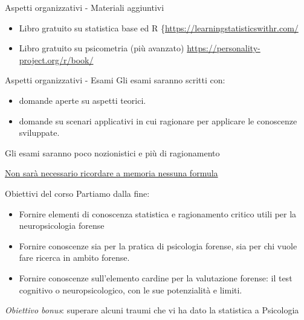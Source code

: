 \documentclass[
  ignorenonframetext,
]{beamer}
\providecommand{\tightlist}{%
  \setlength{\itemsep}{0pt}\setlength{\parskip}{0pt}}
\begin{document}
\begin{frame}{Aspetti organizzativi - Materiali aggiuntivi}
\label{aspetti-organizzativi---materiali-aggiuntivi}
\begin{itemize}
\item
  Libro gratuito su statistica base ed R
  \{\underline{https://learningstatisticswithr.com/}
\item
  Libro gratuito su psicometria (più avanzato)
  \underline{https://personality-project.org/r/book/}
\end{itemize}
\end{frame}

\begin{frame}{Aspetti organizzativi - Esami}
\label{aspetti-organizzativi---esami}
Gli esami saranno scritti con:

\begin{itemize}
\tightlist
\item
  domande aperte su aspetti teorici.
\item
  domande su scenari applicativi in cui ragionare per applicare le
  conoscenze sviluppate.
\end{itemize}

Gli esami saranno poco nozionistici e più di ragionamento

\underline{Non sarà necessario ricordare a memoria nessuna formula}
\end{frame}

\begin{frame}{Obiettivi del corso}
\label{obiettivi-del-corso}
Partiamo dalla fine:

\begin{itemize}
\tightlist
\item
  Fornire elementi di conoscenza statistica e ragionamento critico utili
  per la neuropsicologia forense
\item
  Fornire conoscenze sia per la pratica di psicologia forense, sia per
  chi vuole fare ricerca in ambito forense.
\item
  Fornire conoscenze sull'elemento cardine per la valutazione forense:
  il test cognitivo o neuropsicologico, con le sue potenzialità e
  limiti.
\end{itemize}

\emph{Obiettivo bonus}: superare alcuni traumi che vi ha dato la
statistica a Psicologia
\end{frame}
\end{document}
